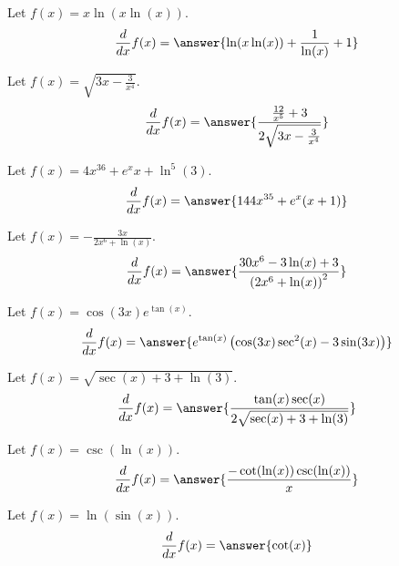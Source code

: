 \documentclass{ximera}
\begin{document}
\begin{shuffle}
\begin{exercise}
Let $f(x)=x \ln (x \ln (x))$.
\[
\ddx f(x) = \answer{\ln (x \ln (x))+\frac{1}{\ln (x)}+1}
\]
\end{exercise}

\begin{exercise}
Let $f(x)=\sqrt{3 x-\frac{3}{x^4}}$.
\[
\ddx f(x) = \answer{\frac{\frac{12}{x^5}+3}{2 \sqrt{3 x-\frac{3}{x^4}}}}
\]
\end{exercise}

\begin{exercise}
Let $f(x)=4 x^{36}+e^x x+\ln ^5(3)$.
\[
\ddx f(x) = \answer{144 x^{35}+e^x (x+1)}
\]
\end{exercise}



\begin{exercise}
Let $f(x)=-\frac{3 x}{2 x^6+\ln (x)}$.
\[
\ddx f(x) = \answer{\frac{30 x^6-3 \ln (x)+3}{\left(2 x^6+\ln (x)\right)^2}}
\]
\end{exercise}

\begin{exercise}
Let $f(x)=\cos (3 x) e^{\tan (x)}$.
\[
\ddx f(x) = \answer{e^{\tan (x)} \left(\cos (3 x) \sec ^2(x)-3 \sin (3 x)\right)}
\]
\end{exercise}

\begin{exercise}
Let $f(x)=\sqrt{\sec (x)+3+\ln (3)}$.
\[
\ddx f(x) = \answer{\frac{\tan (x) \sec (x)}{2 \sqrt{\sec (x)+3+\ln (3)}}}
\]
\end{exercise}

\begin{exercise}
Let $f(x)=\csc (\ln (x))$.
\[
\ddx f(x) = \answer{\frac{-\cot (\ln (x)) \csc (\ln (x))}{x}}
\]
\end{exercise}

\begin{exercise}
Let $f(x)=\ln (\sin (x))$.
\[
\ddx f(x) = \answer{\cot (x)}
\]
\end{exercise}


\end{shuffle}
\end{document}
